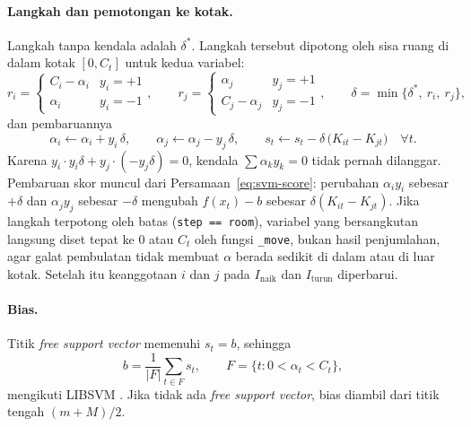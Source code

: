 \paragraph{Langkah dan pemotongan ke kotak.} Langkah tanpa kendala adalah $\delta^{*}$. Langkah tersebut dipotong oleh sisa ruang di dalam kotak $[0, C_t]$ untuk kedua variabel:
\begin{equation}
	r_i = \begin{cases} C_i - \alpha_i & y_i = +1 \\ \alpha_i & y_i = -1 \end{cases}, \qquad
	r_j = \begin{cases} \alpha_j & y_j = +1 \\ C_j - \alpha_j & y_j = -1 \end{cases}, \qquad
	\delta = \min\{\delta^{*},\ r_i,\ r_j\},
\end{equation}
dan pembaruannya
\begin{equation}
	\alpha_i \leftarrow \alpha_i + y_i\,\delta, \qquad \alpha_j \leftarrow \alpha_j - y_j\,\delta, \qquad
	s_t \leftarrow s_t - \delta\,\big(K_{it} - K_{jt}\big)\quad \forall t .
	\label{eq:svm-update}
\end{equation}
Karena $y_i \cdot y_i\delta + y_j\cdot(-y_j\delta) = 0$, kendala $\sum\alpha_k y_k = 0$ tidak pernah dilanggar. Pembaruan skor muncul dari Persamaan~\eqref{eq:svm-score}: perubahan $\alpha_i y_i$ sebesar $+\delta$ dan $\alpha_j y_j$ sebesar $-\delta$ mengubah $f(x_t) - b$ sebesar $\delta(K_{it} - K_{jt})$. Jika langkah terpotong oleh batas (\texttt{step == room}), variabel yang bersangkutan langsung diset tepat ke $0$ atau $C_t$ oleh fungsi \texttt{\_move}, bukan hasil penjumlahan, agar galat pembulatan tidak membuat $\alpha$ berada sedikit di dalam atau di luar kotak. Setelah itu keanggotaan $i$ dan $j$ pada $I_{\text{naik}}$ dan $I_{\text{turun}}$ diperbarui.

\paragraph{Bias.} Titik \textit{free support vector} memenuhi $s_t = b$, sehingga
\begin{equation}
	b = \frac{1}{|F|}\sum_{t \in F} s_t, \qquad F = \{t : 0 < \alpha_t < C_t\},
\end{equation}
mengikuti LIBSVM \cite{chang2011libsvm}. Jika tidak ada \textit{free support vector}, bias diambil dari titik tengah $(m + M)/2$.


